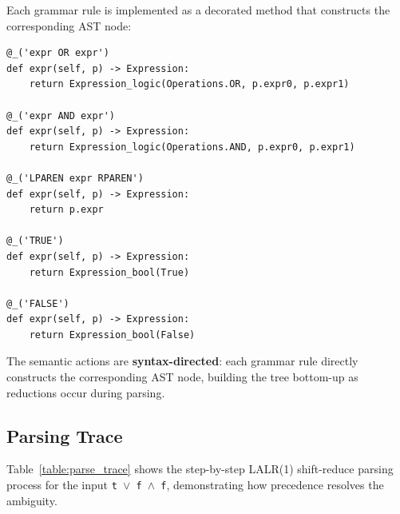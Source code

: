 Each grammar rule is implemented as a decorated method that constructs the corresponding AST node:

\begin{lstlisting}[caption={Grammar rules with semantic actions}, label={lst:grammar_rules}]
@_('expr OR expr')
def expr(self, p) -> Expression:
    return Expression_logic(Operations.OR, p.expr0, p.expr1)

@_('expr AND expr')
def expr(self, p) -> Expression:
    return Expression_logic(Operations.AND, p.expr0, p.expr1)

@_('LPAREN expr RPAREN')
def expr(self, p) -> Expression:
    return p.expr

@_('TRUE')
def expr(self, p) -> Expression:
    return Expression_bool(True)

@_('FALSE')
def expr(self, p) -> Expression:
    return Expression_bool(False)
\end{lstlisting}

The semantic actions are \textbf{syntax-directed}: each grammar rule directly constructs the corresponding AST node, building the tree bottom-up as reductions occur during parsing.

\subsection{Parsing Trace}

Table~\ref{table:parse_trace} shows the step-by-step LALR(1) shift-reduce parsing process for the input \texttt{t $\vee$ f $\wedge$ f}, demonstrating how precedence resolves the ambiguity.

